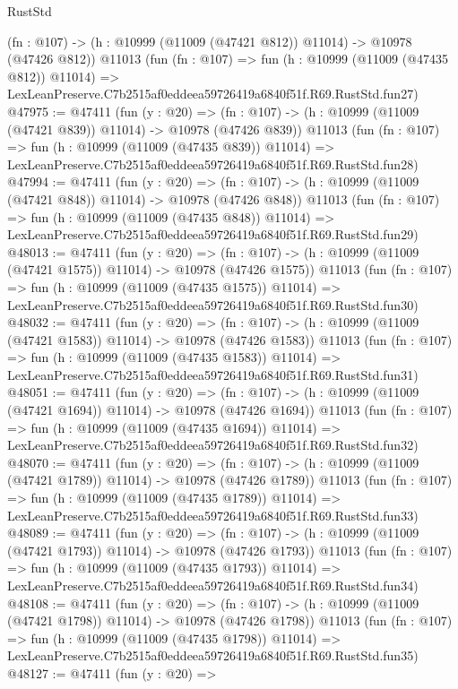 \begin{lexlean}{RustStd}
\begin{coremodule}
    (fn : @107) -> (h : @10999 (@11009 (@47421 @812)) @11014) -> @10978 (@47426 @812))
    @11013
    (fun (fn : @107) =>
    fun (h : @10999 (@11009 (@47435 @812)) @11014) =>
    LexLeanPreserve.C7b2515af0eddeea59726419a6840f51f.R69.RustStd.fun27)
@47975 := @47411
    (fun (y : @20) =>
    (fn : @107) -> (h : @10999 (@11009 (@47421 @839)) @11014) -> @10978 (@47426 @839))
    @11013
    (fun (fn : @107) =>
    fun (h : @10999 (@11009 (@47435 @839)) @11014) =>
    LexLeanPreserve.C7b2515af0eddeea59726419a6840f51f.R69.RustStd.fun28)
@47994 := @47411
    (fun (y : @20) =>
    (fn : @107) -> (h : @10999 (@11009 (@47421 @848)) @11014) -> @10978 (@47426 @848))
    @11013
    (fun (fn : @107) =>
    fun (h : @10999 (@11009 (@47435 @848)) @11014) =>
    LexLeanPreserve.C7b2515af0eddeea59726419a6840f51f.R69.RustStd.fun29)
@48013 := @47411
    (fun (y : @20) =>
    (fn : @107) -> (h : @10999 (@11009 (@47421 @1575)) @11014) -> @10978 (@47426 @1575))
    @11013
    (fun (fn : @107) =>
    fun (h : @10999 (@11009 (@47435 @1575)) @11014) =>
    LexLeanPreserve.C7b2515af0eddeea59726419a6840f51f.R69.RustStd.fun30)
@48032 := @47411
    (fun (y : @20) =>
    (fn : @107) -> (h : @10999 (@11009 (@47421 @1583)) @11014) -> @10978 (@47426 @1583))
    @11013
    (fun (fn : @107) =>
    fun (h : @10999 (@11009 (@47435 @1583)) @11014) =>
    LexLeanPreserve.C7b2515af0eddeea59726419a6840f51f.R69.RustStd.fun31)
@48051 := @47411
    (fun (y : @20) =>
    (fn : @107) -> (h : @10999 (@11009 (@47421 @1694)) @11014) -> @10978 (@47426 @1694))
    @11013
    (fun (fn : @107) =>
    fun (h : @10999 (@11009 (@47435 @1694)) @11014) =>
    LexLeanPreserve.C7b2515af0eddeea59726419a6840f51f.R69.RustStd.fun32)
@48070 := @47411
    (fun (y : @20) =>
    (fn : @107) -> (h : @10999 (@11009 (@47421 @1789)) @11014) -> @10978 (@47426 @1789))
    @11013
    (fun (fn : @107) =>
    fun (h : @10999 (@11009 (@47435 @1789)) @11014) =>
    LexLeanPreserve.C7b2515af0eddeea59726419a6840f51f.R69.RustStd.fun33)
@48089 := @47411
    (fun (y : @20) =>
    (fn : @107) -> (h : @10999 (@11009 (@47421 @1793)) @11014) -> @10978 (@47426 @1793))
    @11013
    (fun (fn : @107) =>
    fun (h : @10999 (@11009 (@47435 @1793)) @11014) =>
    LexLeanPreserve.C7b2515af0eddeea59726419a6840f51f.R69.RustStd.fun34)
@48108 := @47411
    (fun (y : @20) =>
    (fn : @107) -> (h : @10999 (@11009 (@47421 @1798)) @11014) -> @10978 (@47426 @1798))
    @11013
    (fun (fn : @107) =>
    fun (h : @10999 (@11009 (@47435 @1798)) @11014) =>
    LexLeanPreserve.C7b2515af0eddeea59726419a6840f51f.R69.RustStd.fun35)
@48127 := @47411
    (fun (y : @20) =>

\end{coremodule}
\end{lexlean}
